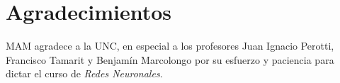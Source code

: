 \documentclass[aps,prl,twocolumn,groupedaddress]{revtex4-2}
\begin{document}
%


\section{Agradecimientos}

\begin{acknowledgments}
MAM agradece a la UNC, en especial a los profesores Juan Ignacio Perotti, Francisco Tamarit y Benjamín Marcolongo
por su esfuerzo y paciencia para dictar el curso de \textit{Redes Neuronales}.
\end{acknowledgments}

\end{document}
